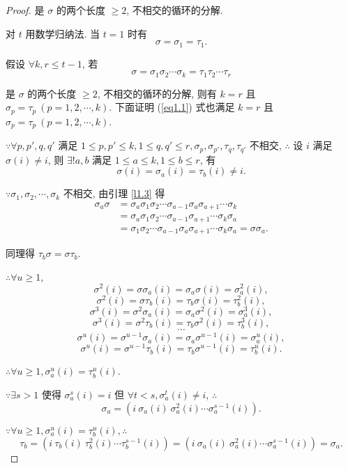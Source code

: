 \documentclass{ctexart}
\begin{document}
\begin{proof}
    是 $\sigma$ 的两个长度 $\geq2$, 不相交的循环的分解.

    对 $t$ 用数学归纳法. 当 $t=1$ 时有
    \[\sigma=\sigma_1=\tau_1.\]

    假设 $\forall k,r\leq t-1$, 若
    \[\sigma=\sigma_1\sigma_2\cdots\sigma_k=\tau_1\tau_2\cdots\tau_r\]

    是 $\sigma$ 的两个长度 $\geq2$, 不相交的循环的分解, 则有 $k=r$ 且 $\sigma_p=\tau_p\ (p=1,2,\cdots,k)$. 下面证明 (\ref{eq1.1}) 式也满足 $k=r$ 且 $\sigma_p=\tau_p\ (p=1,2,\cdots,k)$.

    $\because\forall p,p',q,q'$ 满足 $1\leq p,p'\leq k,1\leq q,q'\leq r,\sigma_p,\sigma_{p'},\tau_q,\tau_{q'}$ 不相交, $\therefore$ 设 $i$ 满足 $\sigma(i)\neq i$, 则 $\exists!a,b$ 满足 $1\leq a\leq k,1\leq b\leq r$, 有
    \[\sigma(i)=\sigma_a(i)=\tau_b(i)\neq i.\]

    $\because\sigma_1,\sigma_2,\cdots,\sigma_k$ 不相交, 由引理 \ref{l1.3} 得
    \begin{align*}
        \sigma_{a}\sigma & =\sigma_{a}\sigma_1\sigma_2\cdots\sigma_{a-1}\sigma_{a}\sigma_{a+1}\cdots\sigma_k \\
        & =\sigma_{a}\sigma_1\sigma_2\cdots\sigma_{a-1}\sigma_{a+1}\cdots\sigma_k\sigma_{a} \\
        & =\sigma_1\sigma_2\cdots\sigma_{a-1}\sigma_{a}\sigma_{a+1}\cdots\sigma_k\sigma_{a}=\sigma\sigma_{a}.
    \end{align*}

    同理得 $\tau_b\sigma=\sigma\tau_b$.

    $\therefore\forall u\geq1$,
    \[\sigma^2(i)=\sigma\sigma_a(i)=\sigma_a\sigma(i)=\sigma_a^2(i),\]
    \[\sigma^2(i)=\sigma\tau_b(i)=\tau_b\sigma(i)=\tau_b^2(i),\]
    \[\sigma^3(i)=\sigma^2\sigma_a(i)=\sigma_a\sigma^2(i)=\sigma_a^3(i),\]
    \[\sigma^3(i)=\sigma^2\tau_b(i)=\tau_b\sigma^2(i)=\tau_b^3(i),\]
    \[\cdots\]
    \[\sigma^u(i)=\sigma^{u-1}\sigma_a(i)=\sigma_a\sigma^{u-1}(i)=\sigma_a^u(i),\]
    \[\sigma^u(i)=\sigma^{u-1}\tau_b(i)=\tau_b\sigma^{u-1}(i)=\tau_b^u(i).\]

    $\therefore\forall u\geq1,\sigma_a^u(i)=\tau_b^u(i)$.

    $\because\exists s>1$ 使得 $\sigma_a^s(i)=i$ 但 $\forall t<s,\sigma_a^t(i)\neq i$, $\therefore$
    \[\sigma_a=(i\ \sigma_a(i)\ \sigma_a^2(i)\cdots\sigma_a^{s-1}(i)).\]

    $\because\forall u\geq1,\sigma_a^u(i)=\tau_b^u(i),\therefore$
    \[\tau_b=(i\ \tau_b(i)\ \tau_b^2(i)\cdots\tau_b^{s-1}(i))=(i\ \sigma_a(i)\ \sigma_a^2(i)\cdots\sigma_a^{s-1}(i))=\sigma_a.\]


\end{proof}
\end{document}

